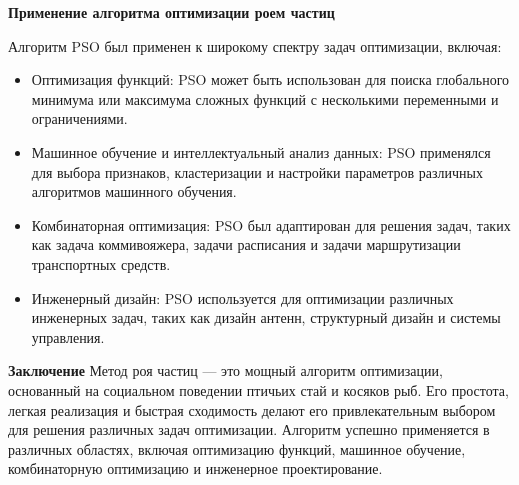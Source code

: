 \textbf{Применение алгоритма оптимизации роем частиц}

Алгоритм PSO был применен к широкому спектру задач оптимизации, включая:

\begin{itemize}
    \item Оптимизация функций: PSO может быть использован для поиска
    глобального минимума или максимума сложных функций
    с несколькими переменными и ограничениями.
    \item Машинное обучение и интеллектуальный анализ данных:
    PSO применялся для выбора признаков, кластеризации и настройки
    параметров различных алгоритмов машинного обучения.
    \item Комбинаторная оптимизация: PSO был адаптирован для решения задач,
    таких как задача коммивояжера, задачи расписания
    и задачи маршрутизации транспортных средств.
    \item Инженерный дизайн: PSO используется для оптимизации различных
    инженерных задач, таких как дизайн антенн,
    структурный дизайн и системы управления.
\end{itemize}

\textbf{Заключение}
Метод роя частиц — это мощный алгоритм оптимизации,
основанный на социальном поведении птичьих стай и косяков рыб.
Его простота, легкая реализация и быстрая сходимость делают его
привлекательным выбором для решения различных задач оптимизации.
Алгоритм успешно применяется в различных областях, включая
оптимизацию функций, машинное обучение,
комбинаторную оптимизацию и инженерное проектирование.
